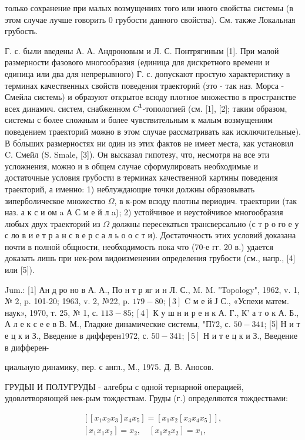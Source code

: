 \documentclass[10pt]{article}
\begin{document}
только сохранение при малых возмущениях того или иного свойства системы (в этом случае лучше говорить 0 грубости данного свойства). См. также Локальная грубость.



Г. с. были введены А. А. Андроновым и Л. С. Понтрягиным [1]. При малой размерности фазового многообразия (единица для дискретного времени и единица или два для непрерывного) Г. с. допускают простую характеристику в терминах качественных свойств поведения траекторий (это - так наз. Морса - Смейла системь) и образуют открытое всюду плотное множество в пространстве всех динамич. систем, снабженном $C^{\mathbf{1}}$-топологией (см. [1], [2]; таким образом, системы с более сложным и более чувствительным к малым возмущениям поведением траекторий можно в этом случае рассматривать как исключительные). В бо́льших размерностях ни один из этих фактов не имеет места, как установил C. Смейл (S. Smale, [3]). Он высказал гипотезу, что, несмотря на все эти усложнения, можно и в общем случае сформулировать необходимые и достаточные условия грубости в терминах качественной картины поведения траекторий, а именно: 1) неблуждающие точки должны образовывать зиперболическое множество $\Omega$, в к-ром всюду плотны периодич. траектории (так наз. а к с и ом a А С м е й л a); 2) устойчивое и неустойчивое многообразия любых двух траекторий из $\Omega$ должны пересекаться трансверсально (с т р о го е у с ло в и е т р а н с в е р с а л ь о о с т и). Достаточность этих условий доказана почти в полной общности, необходимость пока что (70-е гг. 20 в.) удается доказать лишь при нек-ром видоизменении определения грубости (см., напр., [4] или [5]).



Jum.: [1] Ан д ро но в А. А., По н т р яг и н Л. С., M. M. "Topology", 1962, v. 1, № 2, p. 101-20; 1963, v. 2, №22, p. $179-80 ;[3]$ C м е й Ј С., «Успехи матем. наук», 1970, т. 25, № 1, с. $113-85 ;[4]$ К у ш н и р е н к А. Г., К' а т о к А. Б., А л е к с е е в В. М., Гладкие динамические системы, "П72, с. $50-341$; [5] Н и т е ц к и З., Введение в дифферен1972, с. $50-341 ;[5]$ Н и т е ц к и З., Введение в дифферен-

циальную динамику, пер. с англ., М., 1975. Д. В. Аносов.



ГРУДЫІ И ПОЛУГРУДЫ - алгебры с одной тернарной операцией, удовлетворяющей нек-рым тождествам. Груды (г.) определяются тождествами:



\[

\begin{gathered}

{\left[\left[x_{1} x_{2} x_{3}\right] x_{4} x_{5}\right]=\left[x_{1} x_{2}\left[x_{3} x_{4} x_{5}\right]\right],} \\

{\left[x_{1} x_{1} x_{2}\right]=x_{2}, \quad\left[x_{1} x_{2} x_{2}\right]=x_{1},}

\end{gathered}

\]
\end{document}
